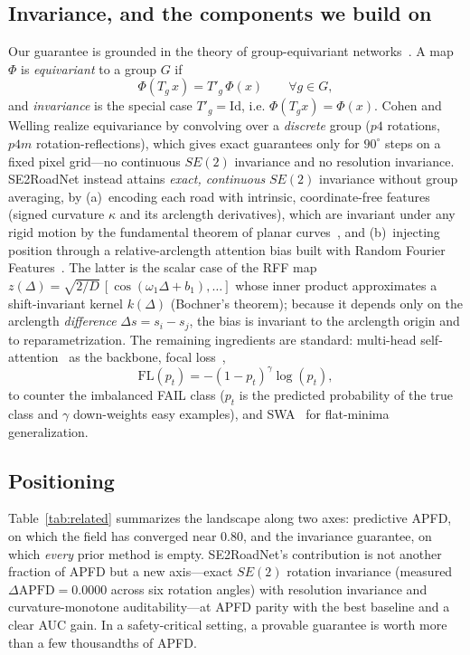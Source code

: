 \subsection{Invariance, and the components we build on}

Our guarantee is grounded in the theory of group-equivariant
networks~\cite{gcnn}. A map $\Phi$ is \emph{equivariant} to a group $G$ if
\begin{equation}
\Phi(T_g\,x)=T'_g\,\Phi(x)\qquad\forall g\in G,
\label{eq:equivariance}
\end{equation}
and \emph{invariance} is the special case $T'_g=\mathrm{Id}$, i.e.
$\Phi(T_g x)=\Phi(x)$. Cohen and Welling realize equivariance by convolving
over a \emph{discrete} group ($p4$ rotations, $p4m$ rotation-reflections), which
gives exact guarantees only for $90^{\circ}$ steps on a fixed pixel grid---no
continuous $SE(2)$ invariance and no resolution invariance. SE2RoadNet instead
attains \emph{exact, continuous} $SE(2)$ invariance without group averaging, by
(a)~encoding each road with intrinsic, coordinate-free features
(signed curvature $\kappa$ and its arclength derivatives), which are invariant
under any rigid motion by the fundamental theorem of planar
curves~\cite{frenet}, and (b)~injecting position through a relative-arclength
attention bias built with Random Fourier Features~\cite{rff}. The latter is the
scalar case of the RFF map $z(\Delta)=\sqrt{2/D}\,[\cos(\omega_1\Delta+b_1),\dots]$
whose inner product approximates a shift-invariant kernel $k(\Delta)$
(Bochner's theorem); because it depends only on the arclength \emph{difference}
$\Delta s=s_i-s_j$, the bias is invariant to the arclength origin and to
reparametrization. The remaining ingredients are standard: multi-head
self-attention~\cite{transformer} as the backbone, focal loss~\cite{focal},
\begin{equation}
\mathrm{FL}(p_t)=-(1-p_t)^{\gamma}\log(p_t),
\label{eq:focal}
\end{equation}
to counter the imbalanced FAIL class ($p_t$ is the predicted probability of the
true class and $\gamma$ down-weights easy examples), and SWA~\cite{swa} for
flat-minima generalization.

\subsection{Positioning}

Table~\ref{tab:related} summarizes the landscape along two axes: predictive
APFD, on which the field has converged near $0.80$, and the invariance
guarantee, on which \emph{every} prior method is empty. SE2RoadNet's
contribution is not another fraction of APFD but a new axis---exact $SE(2)$
rotation invariance (measured $\Delta\mathrm{APFD}=0.0000$ across six rotation
angles) with resolution invariance and curvature-monotone auditability---at
APFD parity with the best baseline and a clear AUC gain. In a
safety-critical setting, a provable guarantee is worth more than a few
thousandths of APFD.

